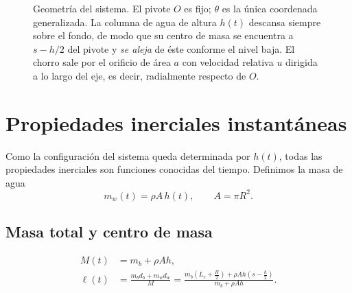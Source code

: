 \documentclass[11pt,a4paper]{article}
\begin{document}
\begin{figure}[H]
\caption{Geometría del sistema. El pivote $O$ es fijo; $\theta$ es la única coordenada
generalizada. La columna de agua de altura $h(t)$ descansa siempre sobre el fondo, de modo que
su centro de masa se encuentra a $s-h/2$ del pivote y \emph{se aleja} de éste conforme
el nivel baja. El chorro sale por el orificio de área $a$ con velocidad relativa $u$
dirigida a lo largo del eje, es decir, radialmente respecto de $O$.}
\label{fig:esquema}
\end{figure}

\section{Propiedades inerciales instantáneas}
\label{sec:inercia}

Como la configuración del sistema queda determinada por $h(t)$, todas las propiedades inerciales
son funciones conocidas del tiempo. Definimos la masa de agua
\begin{equation}
m_w(t) = \rho A\,h(t), \qquad A = \pi R^2 .
\end{equation}

\subsection{Masa total y centro de masa}

\begin{align}
M(t) &= m_b + \rho A h , \\[2mm]
\ell(t) &= \frac{m_b d_b + m_w d_w}{M}
        = \frac{m_b\!\left(L_c+\frac H2\right) + \rho A h\!\left(s-\frac h2\right)}{m_b+\rho A h}.
\label{eq:ell}
\end{align}
\end{document}
